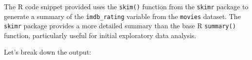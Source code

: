 \documentclass[
]{book}
\newenvironment{Shaded}{\begin{snugshade}}{\end{snugshade}}
\newcommand{\FunctionTok}[1]{\textcolor[rgb]{0.13,0.29,0.53}{\textbf{#1}}}
\newcommand{\NormalTok}[1]{#1}
\newcommand{\SpecialCharTok}[1]{\textcolor[rgb]{0.81,0.36,0.00}{\textbf{#1}}}
\begin{document}
The R code snippet provided uses the \texttt{skim()} function from the \texttt{skimr} package to generate a summary of the \texttt{imdb\_rating} variable from the \texttt{movies} dataset. The \texttt{skimr} package provides a more detailed summary than the base R \texttt{summary()} function, particularly useful for initial exploratory data analysis.

\begin{Shaded}
\end{Shaded}

Let's break down the output:
\end{document}
